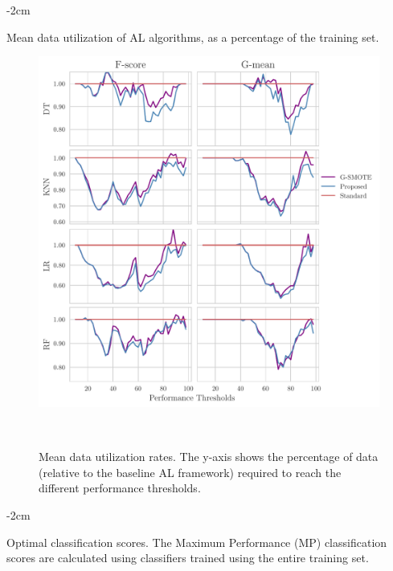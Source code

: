 \documentclass[parskip=full]{scrartcl}
\begin{document}
\begin{table}[H]
    \centering
    \addtolength{\leftskip} {-2cm}
    \addtolength{\rightskip}{-2cm}
    \caption{\label{tab:optimal_data_utilization}
        Mean data utilization of AL algorithms, as a percentage of the
        training set.
    }
\end{table}

\begin{figure}[H]
	\centering
	\includegraphics[width=1\linewidth]{../analysis/data_utilization_rate}
    \caption{%
        Mean data utilization rates. The y-axis shows the percentage of data
        (relative to the baseline AL framework) required to reach the
        different performance thresholds.
    }~\label{fig:dur}
\end{figure}


\begin{table}[H]
    \centering
    \addtolength{\leftskip} {-2cm}
    \addtolength{\rightskip}{-2cm}
    \caption{\label{tab:optimal_mean_std_scores}
        Optimal classification scores. The Maximum Performance (MP)
        classification scores are calculated using classifiers trained using
        the entire training set.
    }
\end{table}
\end{document}
